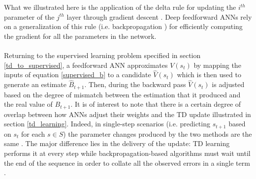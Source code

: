 What we illustrated here is the application of the delta rule for updating the $i^{th}$ parameter of the $j^{th}$ layer through gradient descent \cite{widrow1960adaptive}. Deep feedforward ANNs rely on a generalization of this rule (i.e. backpropagation \cite{rumelhart1986learning}) for efficiently computing the gradient for all the parameters in the network.  
\\
\\
Returning to the supervised learning problem specified in section \ref{td_to_supervised}, a feedforward ANN approximates $V(s_{t})$ by mapping the inputs of equation \ref{supervised_b} to a candidate $\widehat{V}(s_{t})$ which is then used to generate an estimate $\widehat{B}_{t+1}$. Then, during the backward pass $\widehat{V}(s_{t})$ is adjusted based on the degree of mismatch between the estimation that it produced and the real value of $B_{t+1}$. It is of interest to note that there is a certain degree of overlap between how ANNs adjust their weights and the TD update illustrated in section \ref{td_learning}. Indeed, in single-step scenarios (i.e. predicting $s_{t+1}$ based on $s_{t}$ for each $s \in S$) the parameter changes produced by the two methods are the same \cite{sutton1988learning}. The major difference lies in the delivery of the update: TD learning performs it at every step while backpropagation-based algorithms must  wait until the end of the sequence in order to collate all the observed errors in a single term \cite{sutton1988learning}.

